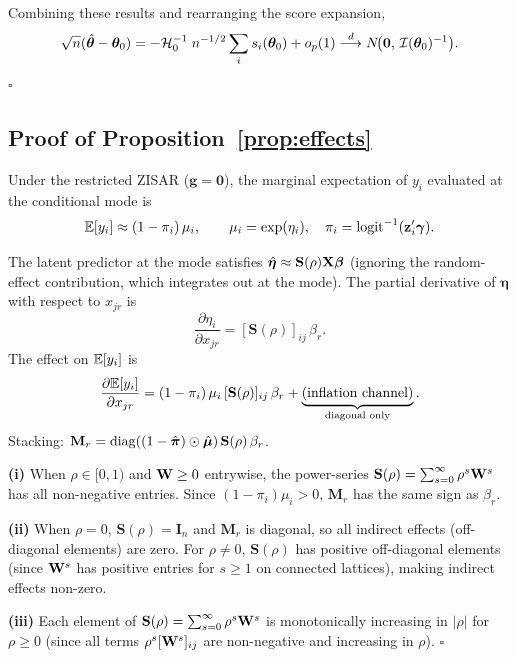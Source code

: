 Combining these results and rearranging the score expansion,
\[
  \sqrt{n}(\hat{\boldsymbol{\theta}} - \boldsymbol{\theta}_0) = -\mathcal{H}_0^{-1}\;n^{-1/2}\sum_i s_i(\boldsymbol{\theta}_0) + o_p(1) \overset{d}{\longrightarrow} N\!\bigl(\mathbf{0},\,\mathcal{I}(\boldsymbol{\theta}_0)^{-1}\bigr).
\]
\hfill$\square$

\subsection{Proof of Proposition~\ref{prop:effects}}\label{app:proof_effects}

Under the restricted ZISAR ($\mathbf{g}=\mathbf{0}$), the marginal expectation of $y_i$ evaluated at the conditional mode is
\[
  \mathbb{E}[y_i] \approx (1 - \pi_i)\,\mu_i, \qquad \mu_i = \exp(\eta_i), \quad \pi_i = \operatorname{logit}^{-1}(\mathbf{z}_i'\boldsymbol{\gamma}).
\]

The latent predictor at the mode satisfies $\hat{\boldsymbol{\eta}} \approx \mathbf{S}(\rho)\mathbf{X}\boldsymbol{\beta}$ (ignoring the random-effect contribution, which integrates out at the mode).
The partial derivative of $\boldsymbol{\eta}$ with respect to $x_{jr}$ is
\[
  \frac{\partial\eta_i}{\partial x_{jr}} = [\mathbf{S}(\rho)]_{ij}\,\beta_r.
\]
The effect on $\mathbb{E}[y_i]$ is
\[
  \frac{\partial\mathbb{E}[y_i]}{\partial x_{jr}} = (1-\pi_i)\,\mu_i\,[\mathbf{S}(\rho)]_{ij}\,\beta_r + \underbrace{(\text{inflation channel})}_{\text{diagonal only}}.
\]
Stacking: $\mathbf{M}_r = \operatorname{diag}((1-\hat{\boldsymbol{\pi}})\odot\hat{\boldsymbol{\mu}})\,\mathbf{S}(\rho)\,\beta_r$.

\textbf{(i)} When $\rho \in [0,1)$ and $\mathbf{W} \geq 0$ entrywise, the power-series $\mathbf{S}(\rho) = \sum_{s=0}^\infty \rho^s\mathbf{W}^s$ has all non-negative entries.
Since $(1-\pi_i)\mu_i > 0$, $\mathbf{M}_r$ has the same sign as $\beta_r$.

\textbf{(ii)} When $\rho = 0$, $\mathbf{S}(\rho) = \mathbf{I}_n$ and $\mathbf{M}_r$ is diagonal, so all indirect effects (off-diagonal elements) are zero.
For $\rho \neq 0$, $\mathbf{S}(\rho)$ has positive off-diagonal elements (since $\mathbf{W}^s$ has positive entries for $s \geq 1$ on connected lattices), making indirect effects non-zero.

\textbf{(iii)} Each element of $\mathbf{S}(\rho) = \sum_{s=0}^\infty \rho^s\mathbf{W}^s$ is monotonically increasing in $|\rho|$ for $\rho \geq 0$ (since all terms $\rho^s[\mathbf{W}^s]_{ij}$ are non-negative and increasing in $\rho$).
\hfill$\square$

